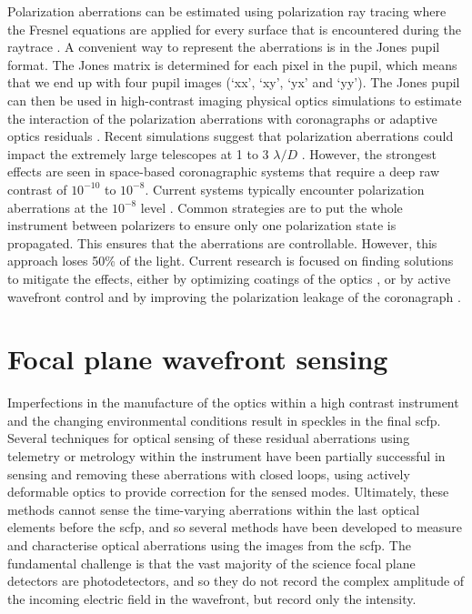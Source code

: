 \documentclass[letterpaper]{ar-1col}
\newcommand{\ld}{$\lambda/D$}
\begin{document}
Polarization aberrations can be estimated using polarization ray tracing where the Fresnel equations are applied for every surface that is encountered during the raytrace \citep{ashcraft2023poke}.
%
A convenient way to represent the aberrations is in the Jones pupil format.
%
The Jones matrix is determined for each pixel in the pupil, which means that we end up with four pupil images (`xx', `xy', `yx' and `yy').
%
The Jones pupil can then be used in high-contrast imaging physical optics simulations to estimate the interaction of the polarization aberrations with coronagraphs \citep{Anche23} or adaptive optics residuals \citep{millar2022polarization}.
%
Recent simulations suggest that polarization aberrations could impact the extremely large telescopes at 1 to 3 \ld{} \citep{Anche23}.
%
However, the strongest effects are seen in space-based coronagraphic systems that require a deep raw contrast of $10^{-10}$ to $10^{-8}$.
%
Current systems typically encounter polarization aberrations at the $10^{-8}$ level \citep{mawet2011recent, seo2019testbed, baudoz2024polarization}.
%
Common strategies are to put the whole instrument between polarizers to ensure only one polarization state is propagated.
%
This ensures that the aberrations are controllable.
%
However, this approach loses 50\% of the light. Current research is focused on finding solutions to mitigate the effects, either by optimizing coatings of the optics \citep{balasubramanian2005polarization,miller2022birefringent}, or by active wavefront control \citep{mendillo2021dual} and by improving the polarization leakage of the coronagraph \citep{Doelman20, Doelman23}.

\section{Focal plane wavefront sensing}

Imperfections in the manufacture of the optics within a high contrast instrument and the changing environmental conditions result in speckles in the final \ac{scfp}.
%
Several techniques for optical sensing of these residual aberrations using telemetry or metrology within the instrument have been partially successful in sensing and removing these aberrations with closed loops, using actively deformable optics to provide correction for the sensed modes.
%
Ultimately, these methods cannot sense the time-varying aberrations within the last optical elements before the \ac{scfp}, and so several methods have been developed to measure and characterise optical aberrations using the images from the \ac{scfp}.
%
The fundamental challenge is that the vast majority of the science focal plane detectors are photodetectors, and so they do not record the complex amplitude of the incoming electric field in the wavefront, but record only the intensity.
\end{document}
